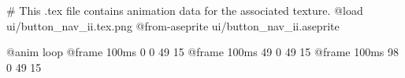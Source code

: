 # This .tex file contains animation data for the associated texture.
@load ui/button_nav_ii.tex.png
@from-aseprite ui/button_nav_ii.aseprite

@anim loop
	@frame 100ms 0 0 49 15
	@frame 100ms 49 0 49 15
	@frame 100ms 98 0 49 15
